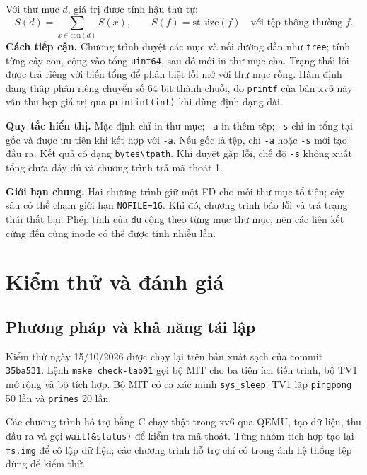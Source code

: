 \documentclass[12pt,a4paper]{article}
\newcommand{\code}[1]{\texttt{#1}}
\begin{document}
Với thư mục $d$, giá trị được tính hậu thứ tự:
\[
 S(d)=\sum_{x\in\mathrm{con}(d)} S(x),\qquad
 S(f)=\mathrm{st.size}(f)\quad\text{với tệp thông thường }f.
\]
\textbf{Cách tiếp cận.} Chương trình duyệt các mục và nối đường dẫn như \code{tree}; tính từng cây con, cộng vào tổng \code{uint64}, sau đó mới in thư mục cha. Trạng thái lỗi được trả riêng với biến tổng để phân biệt lỗi mở với thư mục rỗng. Hàm định dạng thập phân riêng chuyển số 64 bit thành chuỗi, do \code{printf} của bản xv6 này vẫn thu hẹp giá trị qua \code{printint(int)} khi dùng định dạng dài.

\textbf{Quy tắc hiển thị.} Mặc định chỉ in thư mục; \code{-a} in thêm tệp; \code{-s} chỉ in tổng tại gốc và được ưu tiên khi kết hợp với \code{-a}. Nếu gốc là tệp, chỉ \code{-a} hoặc \code{-s} mới tạo đầu ra. Kết quả có dạng \code{bytes\textbackslash{}tpath}. Khi duyệt gặp lỗi, chế độ \code{-s} không xuất tổng chưa đầy đủ và chương trình trả mã thoát 1.

\textbf{Giới hạn chung.} Hai chương trình giữ một FD cho mỗi thư mục tổ tiên; cây sâu có thể chạm giới hạn \code{NOFILE=16}. Khi đó, chương trình báo lỗi và trả trạng thái thất bại. Phép tính của \code{du} cộng theo từng mục thư mục, nên các liên kết cứng đến cùng inode có thể được tính nhiều lần.

\clearpage
\section{Kiểm thử và đánh giá}\label{sec:testing}
\subsection{Phương pháp và khả năng tái lập}
Kiểm thử ngày 15/10/2026 được chạy lại trên bản xuất sạch của commit \code{35ba531}. Lệnh \code{make check-lab01} gọi bộ MIT cho ba tiện ích tiến trình, bộ TV1 mở rộng và bộ tích hợp. Bộ MIT có ca xác minh \code{sys\_sleep}; TV1 lặp \code{pingpong} 50 lần và \code{primes} 20 lần.

Các chương trình hỗ trợ bằng C chạy thật trong xv6 qua QEMU, tạo dữ liệu, thu đầu ra và gọi \code{wait(\&status)} để kiểm tra mã thoát. Từng nhóm tích hợp tạo lại \code{fs.img} để cô lập dữ liệu; các chương trình hỗ trợ chỉ có trong ảnh hệ thống tệp dùng để kiểm thử.
\end{document}

